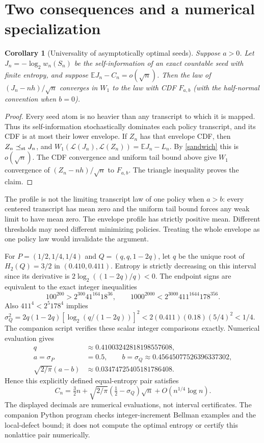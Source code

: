 \documentclass[10pt,a4paper]{article}
\newtheorem{corollary}[theorem]{Corollary}
\newcommand{\E}{\mathbb E}
\begin{document}
\section{Two consequences and a numerical specialization}
\begin{corollary}[Universality of asymptotically optimal seeds]
Suppose $a>0$. Let $J_n=-\log_2 w_n(S_n)$ be the self-information of an
exact countable seed with finite entropy, and suppose $\E J_n-C_n=o(\sqrt n)$.
Then the law of $(J_n-nh)/\sqrt n$ converges in $W_1$ to the law with CDF
$F_{a,b}$ (with the half-normal convention when $b=0$).
\end{corollary}
\begin{proof}
Every seed atom is no heavier than any transcript to which it is mapped.
Thus its self-information stochastically dominates each policy transcript,
and its CDF is at most their lower envelope. If $Z_n$ has that envelope CDF,
then $Z_n\preceq_{\rm st}J_n$, and
$W_1(\mathcal L(J_n),\mathcal L(Z_n))=\E J_n-L_n$.
By \eqref{sandwich} this is $o(\sqrt n)$. The CDF convergence and uniform
tail bound above give $W_1$ convergence of $(Z_n-nh)/\sqrt n$ to $F_{a,b}$.
The triangle inequality proves the claim.
\end{proof}

The profile is not the limiting transcript law of one policy when $a>b$:
every centered transcript has mean zero and the uniform tail bound forces
any weak limit to have mean zero. The envelope profile has strictly positive
mean. Different thresholds may need different minimizing policies. Treating
the whole envelope as one policy law would invalidate the argument.

For $P=(1/2,1/4,1/4)$ and $Q=(q,q,1-2q)$, let $q$ be the unique root of
$H_2(Q)=3/2$ in $(0.410,0.411)$. Entropy is strictly decreasing on this
interval since its derivative is $2\log_2((1-2q)/q)<0$. The endpoint signs
are equivalent to the exact integer inequalities
\[
100^{200}>2^{300}41^{164}18^{36},\qquad
1000^{2000}<2^{3000}411^{1644}178^{356}.
\]
Also $411^4<2^5 178^4$ implies
$\sigma_Q^2=2q(1-2q)[\log_2(q/(1-2q))]^2
 <2(0.411)(0.18)(5/4)^2<1/4$.
The companion script verifies these scalar integer comparisons exactly.
Numerical evaluation gives
\begin{align*}
 q&\approx0.41003242818198557608,\\
 a=\sigma_P&=0.5,\qquad b=\sigma_Q\approx0.45645077526396337302,\\
 \sqrt{2/\pi}(a-b)&\approx0.03474725405181786408.
\end{align*}
Hence this explicitly defined equal-entropy pair satisfies
\[
 C_n=\tfrac32 n+\sqrt{2/\pi}(\tfrac12-\sigma_Q)\sqrt n
       +O(n^{1/4}\log n).
\]
The displayed decimals are numerical evaluations, not interval certificates.
The companion Python program checks integer-increment Bellman examples and
the local-defect bound; it does not compute the optimal entropy or certify
this nonlattice pair numerically.
\end{document}

